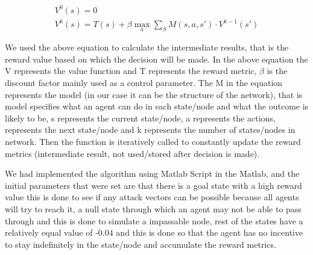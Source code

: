 \begin{equation} 
    \label{eq:infinite_horizon}
    \begin{aligned}
    V^0(s) = 0 \\
    V^k(s) = T(s) + \beta \max_a \sum_S M(s,a,s') \cdot V^{k-1}(s')
    \end{aligned}
\end{equation}


We used the above equation to calculate the intermediate results, that is the
reward value based on which the decision will be made. In the above equation the
V represents the value function and T represents the reward metric, $\beta$ is the
discount factor mainly used as a control parameter. The M in the equation
represents the model (in our case it can be the structure of the network), that
is model specifies what an agent can do in each state/node and what the outcome
is likely to be, s represents the current state/node, a represents the actions,
represents the next state/node and k represents the number of states/nodes in
network. Then the function is iteratively called to constantly update the reward
metrics (intermediate result, not used/stored after decision is made).

We had implemented the algorithm using Matlab Script in the Matlab, and the
initial parameters that were set are that there is a goal state with a high
reward value this is done to see if any attack vectors can be possible because
all agents will try to reach it, a null state through which an agent may not be
able to pass through and this is done to simulate a impassable node, rest of the
states have a relatively equal value of -0.04 and this is done so that the agent
has no incentive to stay indefinitely in the state/node and accumulate the
reward metrics.
 
